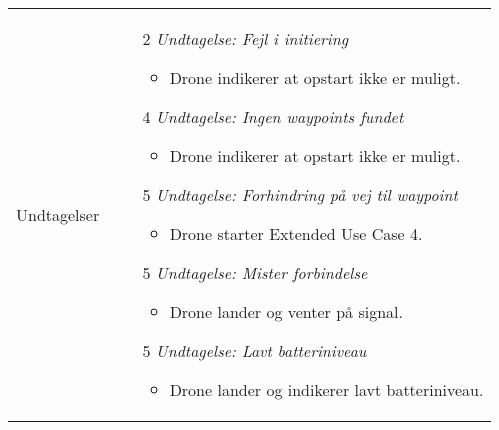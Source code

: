 \documentclass[Main]{subfiles}
\begin{document}
\begin{longtable}{|p{}|p{}|}
Undtagelser & \vspace{-8mm}

	\begin{enumerate}[noitemsep,nolistsep,leftmargin=*]
	\item[2] \textit{Undtagelse: Fejl i initiering}
	
		\begin{itemize}[noitemsep,nolistsep]
		\item Drone indikerer at opstart ikke er muligt.
		\end{itemize}
	
	\end{enumerate}


	\begin{enumerate}[noitemsep,nolistsep,leftmargin=*]
	\item[4] \textit{Undtagelse: Ingen waypoints fundet}
		\begin{itemize}[noitemsep,nolistsep]
		\item Drone indikerer at opstart ikke er muligt.
		\end{itemize}
		
	\end{enumerate}
	
	
	\begin{enumerate}[noitemsep,nolistsep,leftmargin=*]
	\item[5] \textit{Undtagelse: Forhindring på vej til waypoint}
		\begin{itemize}[noitemsep,nolistsep]
		\item Drone starter Extended Use Case 4.
		\end{itemize}
	\end{enumerate}
	
	
	\begin{enumerate}[noitemsep,nolistsep,leftmargin=*]
	\item[5] \textit{Undtagelse: Mister forbindelse}
		\begin{itemize}[noitemsep,nolistsep]
		\item Drone lander og venter på signal.
		\end{itemize}
	\end{enumerate}


	\begin{enumerate}[noitemsep,nolistsep,leftmargin=*]
	\item[5] \textit{Undtagelse: Lavt batteriniveau}
		\begin{itemize}[noitemsep,nolistsep]
	\item Drone lander og indikerer lavt batteriniveau.
		\end{itemize}
	\end{enumerate}


\end{longtable}
\end{document}
